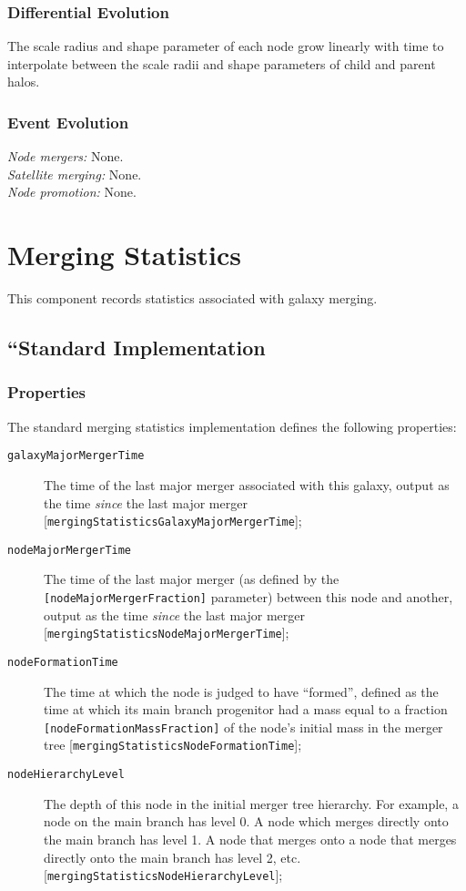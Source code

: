 \subsubsection{Differential Evolution}

The scale radius and shape parameter of each node grow linearly with time to interpolate between the scale radii and shape parameters of child and parent halos.

\subsubsection{Event Evolution}

\noindent\emph{Node mergers:} None.\\

\noindent\emph{Satellite merging:} None.\\

\noindent\emph{Node promotion:} None.\\


\section{Merging Statistics}

This \gls{component} records statistics associated with galaxy merging.

\subsection{``Standard Implementation}

\subsubsection{Properties}

The standard merging statistics implementation defines the following properties:
\begin{description}
 \item [{\tt galaxyMajorMergerTime}] The time of the last major merger associated with this galaxy, output as the time \emph{since} the last major merger [{\tt mergingStatisticsGalaxyMajorMergerTime}];
 \item [{\tt nodeMajorMergerTime}] The time of the last major merger (as defined by the {\tt [nodeMajorMergerFraction]} parameter) between this \gls{node} and another, output as the time \emph{since} the last major merger [{\tt mergingStatisticsNodeMajorMergerTime}];
 \item [{\tt nodeFormationTime}] The time at which the \gls{node} is judged to have ``formed'', defined as the time at which its main branch progenitor had a mass equal to a fraction {\tt [nodeFormationMassFraction]} of the node's initial mass in the merger tree [{\tt mergingStatisticsNodeFormationTime}];
 \item [{\tt nodeHierarchyLevel}] The depth of this node in the initial merger tree hierarchy. For example, a node on the main branch has level 0. A node which merges directly onto the main branch has level 1. A node that merges onto a node that merges directly onto the main branch has level 2, etc. [{\tt mergingStatisticsNodeHierarchyLevel}];
\end{description}

